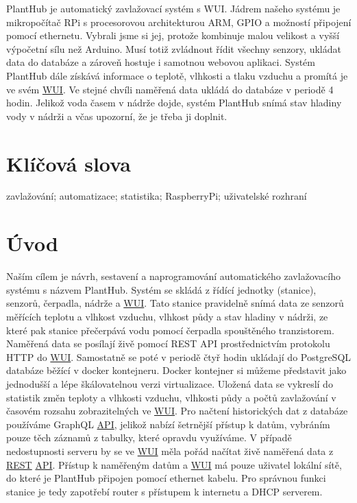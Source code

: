 \documentclass[12pt,a4paper]{article}
\begin{document}
PlantHub je automatický zavlažovací systém s \ac{WUI}. Jádrem našeho systému je mikropočítač \ac{RPi} s procesorovou architekturou \ac{ARM}, \ac{GPIO} a možností připojení pomocí ethernetu. Vybrali jsme si jej, protože kombinuje malou velikost a vyšší výpočetní sílu než Arduino. Musí totiž zvládnout řídit všechny senzory, ukládat data do databáze a zároveň hostuje i samotnou webovou aplikaci. Systém PlantHub dále získává informace o teplotě, vlhkosti a tlaku vzduchu a promítá je ve svém \underline{\underline{\ac{WUI}}}. Ve stejné chvíli naměřená data ukládá do databáze v periodě 4 hodin. Jelikož voda časem v nádrže dojde, systém PlantHub snímá stav hladiny vody v nádrži a včas upozorní, že je třeba ji doplnit.

\section*{Klíčová slova}

\noindent zavlažování; automatizace; statistika; RaspberryPi; uživatelské rozhraní

\clearpage

\tableofcontents

\clearpage

\section{Úvod}


Naším cílem je návrh, sestavení a naprogramování automatického zavlažovacího systému s názvem PlantHub. Systém se skládá z řídící jednotky (stanice), senzorů, čerpadla, nádrže a \space \underline{\ac{WUI}}. Tato stanice pravidelně snímá data ze senzorů měřících teplotu a vlhkost vzduchu, vlhkost půdy a stav hladiny v nádrži, ze které pak stanice přečerpává vodu pomocí čerpadla spouštěného tranzistorem. Naměřená data se posílají živě pomocí \ac{REST} \space \ac{API} prostřednictvím protokolu HTTP do \underline{\ac{WUI}}. Samostatně se poté v periodě čtyř hodin ukládají do PostgreSQL databáze běžící v docker kontejneru. Docker kontejner si můžeme představit jako jednodušší a lépe škálovatelnou verzi virtualizace. Uložená data se vykreslí do statistik změn teploty a vlhkosti vzduchu, vlhkosti půdy a počtů zavlažování v časovém rozsahu zobrazitelných ve \underline{\ac{WUI}}. Pro načtení historických dat z databáze používáme \ac{GraphQL} \underline{\ac{API}}, jelikož nabízí šetrnější přístup k datům, vybráním pouze těch záznamů z tabulky, které opravdu využíváme. V případě nedostupnosti serveru by se ve \space \underline{\ac{WUI}} měla pořád načítat živě naměřená data z \underline{\ac{REST}} \space \underline{\ac{API}}. Přístup k naměřeným datům a \underline{\ac{WUI}} má pouze uživatel lokální sítě, do které je PlantHub připojen pomocí ethernet kabelu. Pro správnou funkci stanice je tedy zapotřebí router s přístupem k internetu a DHCP serverem.
\end{document}
